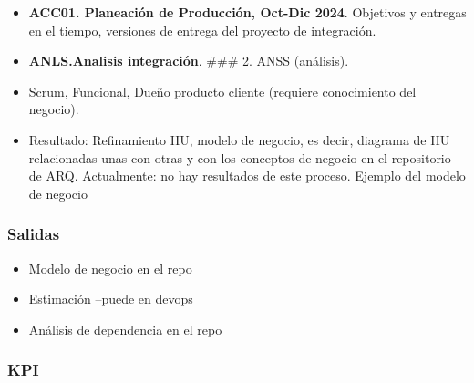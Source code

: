 \documentclass[
  paper=a4,
  ,captions=tableheading
]{scrartcl}
\providecommand{\tightlist}{%
  \setlength{\itemsep}{0pt}\setlength{\parskip}{0pt}}
\begin{document}
\begin{itemize}
\item
  \textbf{ACC01. Planeación de Producción, Oct-Dic 2024}. Objetivos y
  entregas en el tiempo, versiones de entrega del proyecto de
  integración.
\item
  \textbf{ANLS.Analisis integración}. \#\#\# 2. ANSS (análisis).
\item
  Scrum, Funcional, Dueño producto cliente (requiere conocimiento del
  negocio).
\item
  Resultado: Refinamiento HU, modelo de negocio, es decir, diagrama de
  HU relacionadas unas con otras y con los conceptos de negocio en el
  repositorio de ARQ. Actualmente: no hay resultados de este proceso.
  Ejemplo del modelo de negocio
\end{itemize}

\subsubsection{Salidas}\label{sec:salidas}

\begin{itemize}
\tightlist
\item
  Modelo de negocio en el repo
\item
  Estimación --puede en devops
\item
  Análisis de dependencia en el repo
\end{itemize}

\subsubsection{KPI}\label{sec:kpi}
\end{document}
